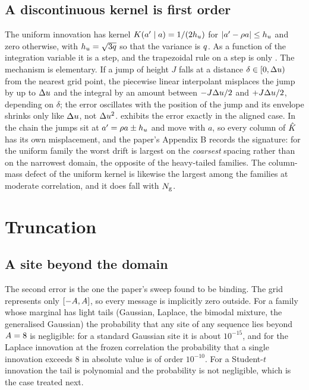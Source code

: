 \subsection{A discontinuous kernel is first order}
\label{sec:gq-discontinuous}

The uniform innovation has kernel $K(a'\mid a)=1/(2h_u)$ for
$|a'-\rho a|\le h_u$ and zero otherwise, with $h_u=\sqrt{3q}$ so that the variance
is $q$. As a function of the integration variable it is a step, and the trapezoidal
rule on a step is only . The mechanism is elementary. If a jump of
height $J$ falls at a distance $\delta\in[0,\Delta u)$ from the nearest grid point, the
piecewise linear interpolant misplaces the jump by up to $\Delta u$ and the integral by
an amount between $-J\Delta u/2$ and $+J\Delta u/2$, depending on $\delta$; the error
oscillates with the position of the jump and its envelope shrinks only like $\Delta u$,
not $\Delta u^2$.  exhibits the error exactly in the aligned case.
In the chain the jumps sit at $a'=\rho a\pm h_u$ and move with $a$, so every column of
$\hat{K}$ has its own misplacement, and the paper's Appendix B records the
signature: for the uniform family the worst drift is largest on the \emph{coarsest}
spacing rather than on the narrowest domain, the opposite of the heavy-tailed families.
The column-mass defect of the uniform kernel is likewise the largest among the
families at moderate correlation, and it does fall with $N_{\mathrm{g}}$.

\section{Truncation}

\subsection{A site beyond the domain}

The second error is the one the paper's sweep found to be binding. The grid represents
only $[-A,A]$, so every message is implicitly zero outside. For a
family whose marginal has light tails (Gaussian, Laplace, the bimodal mixture, the
generalised Gaussian) the probability that any site of any sequence lies beyond
$A=8$ is negligible: for a standard Gaussian site it is about $10^{-15}$, and
for the Laplace innovation at the frozen correlation the probability that a single
innovation exceeds $8$ in absolute value is of order $10^{-10}$. For a Student-$t$
innovation the tail is polynomial and the probability is not negligible, which is the
case treated next.

